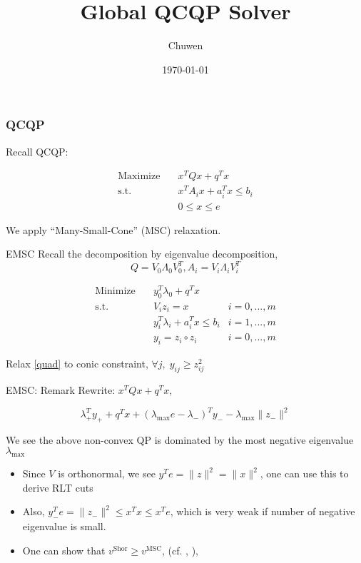 
\usepackage{subfig}
\usepackage[style=authoryear]{biblatex}
\usepackage{bm}
\title{Global QCQP Solver}
\author{Chuwen}
\date{\today}




\fontsize{10pt}{11.2}\selectfont
\frame{\titlepage}



\begin{frame}
  \frametitle{QCQP}
  Recall QCQP:

  \begin{equation}
    \begin{aligned}
      \mathrm{Maximize}\quad & x^TQx + q^T x                   \\
      \mathrm{s.t.}  \quad   & x^{T} A_i x  + a_i^Tx   \le b_i \\
                             & 0\le x\le e
    \end{aligned}
  \end{equation}

  We apply ``Many-Small-Cone'' (MSC) relaxation.
\end{frame}


\begin{frame}{EMSC}
  Recall the decomposition by eigenvalue decomposition,
  \[Q = V_0\Lambda_0 V_0 ^T, A_i = V_i\Lambda_i V_i^T \]

  \begin{align}
    \nonumber \mathrm{Minimize}\quad & y_0 ^T\lambda_0 + q^Tx                         \\
    \mathrm{s.t.} \quad              & V_i z_i = x                        & i=0,...,m \\
                                     & y_i ^T\lambda_i  + a_i^Tx  \le b_i & i=1,...,m \\
    \label{quad}                     & y_i = z_i \circ z_i                & i=0,...,m
  \end{align}

  Relax \eqref{quad} to conic constraint, \(\forall j, \; y_{ij} \ge z^2_{ij}\)
\end{frame}



\begin{frame}{EMSC: Remark}
  Rewrite:  \(x^TQx + q^T x \),

  \[\lambda_+ ^T y_+ + q^Tx + (\lambda_{\max} e - \lambda_-)^T y_- - \lambda_{\max} \|z_-\|^2  \]

  We see the above non-convex QP is dominated by the most negative eigenvalue \(\lambda_{\max}\)
  \begin{itemize}
    \item Since \(V\) is orthonormal, we see \(y^Te = \|z\|^2 = \|x\|^2\), one can use this to derive RLT cuts
    \item Also, \(y_-^Te= \|z_-\|^2 \le x^Tx \le x^Te \), which is very weak if number of negative eigenvalue is small.
    \item One can show that \(v^{\mathrm{Shor}} \ge v^{\mathrm{MSC}}\), (cf. \cite{luo_new_2019}, \cite{luo_new_2021}),

  \end{itemize}
\end{frame}

